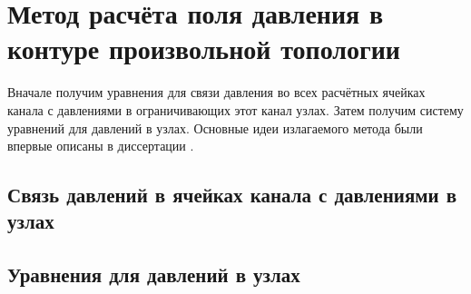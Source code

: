 
\section{Метод расчёта поля давления в контуре произвольной топологии}
\label{sec:section6}
Вначале получим уравнения для связи давления во всех расчётных ячейках канала с давлениями в ограничивающих этот канал узлах. Затем получим систему уравнений для давлений в узлах. Основные идеи излагаемого метода были впервые описаны в диссертации \cite{DisserKORSAR}.
\subsection{Связь давлений в ячейках канала с давлениями в узлах}	

\subsection{Уравнения для давлений в узлах}

\newpage

